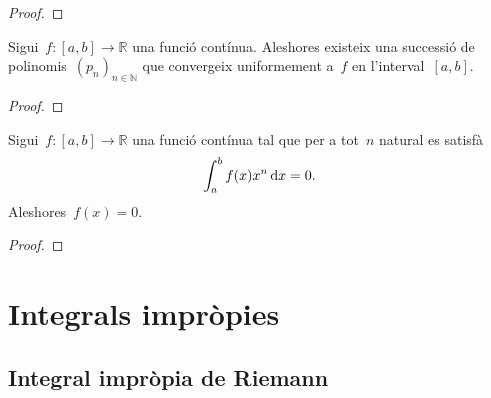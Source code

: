 \documentclass[../../main.tex]{subfiles}
\begin{document}
    \begin{proof}
    \end{proof}
    \begin{theorem}
        \label{thm:Teorema d'aproximació polinòmica de Weierstrass}
        Sigui~\(f\colon[a,b]\longrightarrow\mathbb{R}\) una funció contínua.
        Aleshores existeix una successió de polinomis~\((p_{n})_{n\in\mathbb{N}}\) que convergeix uniformement a~\(f\) en l'interval~\([a,b]\).
    \end{theorem}
    \begin{proof}
    \end{proof}
    \begin{corollary}
        Sigui~\(f\colon[a,b]\longrightarrow\mathbb{R}\) una funció contínua tal que per a tot~\(n\) natural es satisfà
        \[
            \int_{a}^{b}f(x)x^{n}\mathop{}\!\mathrm{d} x=0.
        \]
        Aleshores~\(f(x)=0\).
    \end{corollary}
    \begin{proof}
    \end{proof}
\chapter{Integrals impròpies}
\section{Integral impròpia de Riemann}
\end{document}
